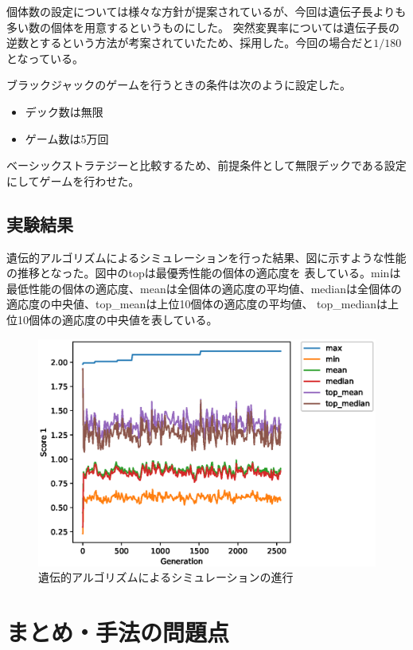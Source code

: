 個体数の設定については様々な方針が提案されているが、今回は遺伝子長よりも多い数の個体を用意するというものにした。
突然変異率については遺伝子長の逆数とするという方法が考案されていたため、採用した。今回の場合だと$1/180$となっている。

ブラックジャックのゲームを行うときの条件は次のように設定した。

\begin{itemize}
\item デック数は無限
\item ゲーム数は5万回
\end{itemize}

ベーシックストラテジーと比較するため、前提条件として無限デックである設定にしてゲームを行わせた。

\subsection{実験結果}
遺伝的アルゴリズムによるシミュレーションを行った結果、図に示すような性能の推移となった。図中のtopは最優秀性能の個体の適応度を
表している。minは最低性能の個体の適応度、meanは全個体の適応度の平均値、medianは全個体の適応度の中央値、top\_meanは上位10個体の適応度の平均値、
top\_medianは上位10個体の適応度の中央値を表している。

  \begin{figure}[htbp]
    \includegraphics[width=14.0cm]{figure/gaprocess.eps}
    \caption{遺伝的アルゴリズムによるシミュレーションの進行}
    \label{gaprocess}
  \end{figure}


\section{まとめ・手法の問題点}